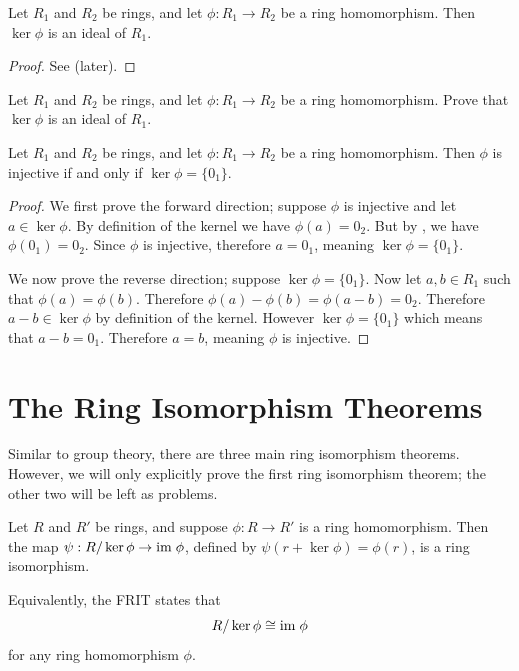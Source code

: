 \begin{proposition}\label{prop-kernel-is-an-ideal}
    Let $R_1$ and $R_2$ be rings, and let $\phi: R_1 \to R_2$ be a ring homomorphism. Then $\ker\phi$ is an ideal of $R_1$.
\end{proposition}
\begin{proof}
    See  (later).
\end{proof}
\begin{exercise}\label{exercise-kernel-is-an-ideal}
    Let $R_1$ and $R_2$ be rings, and let $\phi: R_1 \to R_2$ be a ring homomorphism. Prove that $\ker\phi$ is an ideal of $R_1$.
\end{exercise}

\begin{proposition}
    Let $R_1$ and $R_2$ be rings, and let $\phi: R_1 \to R_2$ be a ring homomorphism. Then $\phi$ is injective if and only if $\ker\phi = \{0_1\}$.
\end{proposition}
\begin{proof}
    We first prove the forward direction; suppose $\phi$ is injective and let $a \in \ker\phi$. By definition of the kernel we have $\phi(a) = 0_2$. But by , we have $\phi(0_1) = 0_2$. Since $\phi$ is injective, therefore $a = 0_1$, meaning $\ker\phi = \{0_1\}$.

    We now prove the reverse direction; suppose $\ker\phi = \{0_1\}$. Now let $a,b \in R_1$ such that $\phi(a) = \phi(b)$. Therefore $\phi(a) - \phi(b) = \phi(a-b) = 0_2$. Therefore $a-b \in \ker\phi$ by definition of the kernel. However $\ker\phi = \{0_1\}$ which means that $a - b = 0_1$. Therefore $a = b$, meaning $\phi$ is injective.
\end{proof}

\section{The Ring Isomorphism Theorems}
Similar to group theory, there are three main ring isomorphism theorems. However, we will only explicitly prove the first ring isomorphism theorem; the other two will be left as problems.

\begin{theorem}\label{thrm-ring-isomorphism-1}
    Let $R$ and $R'$ be rings, and suppose $\phi: R \to R'$ is a ring homomorphism. Then the map $\psi: R / \ker\phi \to \mathrm{im}\;\phi$, defined by $\psi(r + \ker\phi) = \phi(r)$, is a ring isomorphism.
\end{theorem}
\begin{remark}
    Equivalently, the FRIT states that
    \[
        R / \ker\phi \cong \mathrm{im}\;\phi
    \]
    for any ring homomorphism $\phi$.
\end{remark}

